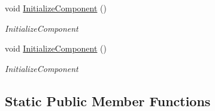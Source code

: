 \begin{DoxyCompactItemize}
void \mbox{\hyperlink{classprojekt_1_1_app_aadb8f9c97545ff79106a903c12558d38}{Initialize\+Component}} ()
\begin{DoxyCompactList}\small\item\em Initialize\+Component \end{DoxyCompactList}\item 
void \mbox{\hyperlink{classprojekt_1_1_app_aadb8f9c97545ff79106a903c12558d38}{Initialize\+Component}} ()
\begin{DoxyCompactList}\small\item\em Initialize\+Component \end{DoxyCompactList}\end{DoxyCompactItemize}
\subsection*{Static Public Member Functions}
